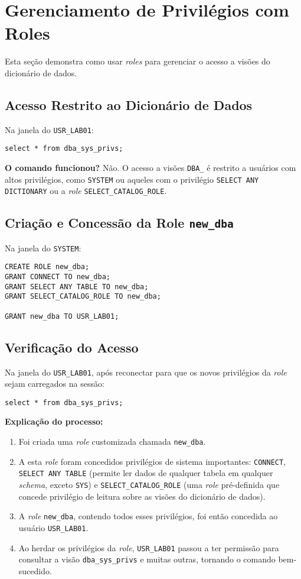 \documentclass[a4paper, 12pt]{article}
\begin{document}
\section{Gerenciamento de Privilégios com Roles}
Esta seção demonstra como usar \textit{roles} para gerenciar o acesso a visões do dicionário de dados.

\subsection{Acesso Restrito ao Dicionário de Dados}
Na janela do \texttt{USR\_LAB01}:
\begin{lstlisting}
select * from dba_sys_privs;
\end{lstlisting}
\textbf{O comando funcionou?} Não. O acesso a visões \texttt{DBA\_} é restrito a usuários com altos privilégios, como \texttt{SYSTEM} ou aqueles com o privilégio \texttt{SELECT ANY DICTIONARY} ou a \textit{role} \texttt{SELECT\_CATALOG\_ROLE}.

\subsection{Criação e Concessão da Role \texttt{new\_dba}}
Na janela do \texttt{SYSTEM}:
\begin{lstlisting}
CREATE ROLE new_dba;
GRANT CONNECT TO new_dba;
GRANT SELECT ANY TABLE TO new_dba;
GRANT SELECT_CATALOG_ROLE TO new_dba;

GRANT new_dba TO USR_LAB01;
\end{lstlisting}

\subsection{Verificação do Acesso}
Na janela do \texttt{USR\_LAB01}, após reconectar para que os novos privilégios da \textit{role} sejam carregados na sessão:
\begin{lstlisting}
select * from dba_sys_privs;
\end{lstlisting}
\textbf{Explicação do processo:}
\begin{enumerate}
    \item Foi criada uma \textit{role} customizada chamada \texttt{new\_dba}.
    \item A esta \textit{role} foram concedidos privilégios de sistema importantes: \texttt{CONNECT}, \texttt{SELECT ANY TABLE} (permite ler dados de qualquer tabela em qualquer \textit{schema}, exceto \texttt{SYS}) e \texttt{SELECT\_CATALOG\_ROLE} (uma \textit{role} pré-definida que concede privilégio de leitura sobre as visões do dicionário de dados).
    \item A \textit{role} \texttt{new\_dba}, contendo todos esses privilégios, foi então concedida ao usuário \texttt{USR\_LAB01}.
    \item Ao herdar os privilégios da \textit{role}, \texttt{USR\_LAB01} passou a ter permissão para consultar a visão \texttt{dba\_sys\_privs} e muitas outras, tornando o comando bem-sucedido.
\end{enumerate}
\end{document}
